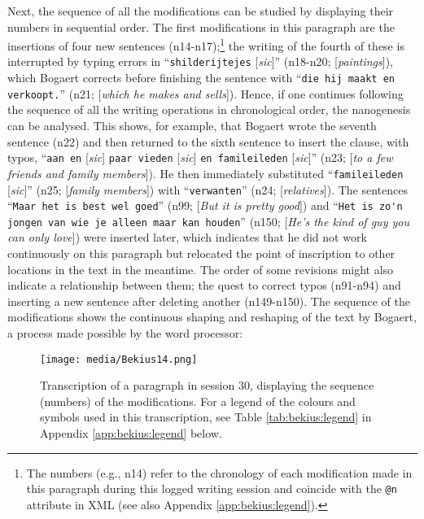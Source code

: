 \begin{paper}
\noindent Next, the sequence of all the modifications can be studied by displaying
their numbers in sequential order. The first modifications in this
paragraph are the insertions of four new sentences (n14-n17);\footnote{The numbers (e.g., n14) refer to the chronology of each modification made in this paragraph during this logged writing session and coincide with the \lstinline[language=XML]!@n! attribute in XML (see also Appendix \ref{app:bekius:legend}).} the writing of the fourth of these is interrupted by
typing errors in ``\verb|shilderijtejes| [\emph{sic}]'' (n18-n20;
[\emph{paintings}]), which Bogaert corrects before
finishing the sentence with ``\verb|die hij maakt en verkoopt.|'' (n21; [\emph{which
he makes and sells}]). Hence, if one continues following the sequence of
all the writing operations in chronological order, the nanogenesis can
be analysed. This shows, for example, that Bogaert wrote the seventh
sentence (n22) and then returned to the sixth sentence to insert the
clause, with typos, ``\verb|aan en| [\emph{sic}] \verb|paar vieden| [\emph{sic}] \verb|en famileileden|
[\emph{sic}]'' (n23; [\emph{to a few friends and family
members}]). He then immediately substituted ``\verb|famileileden|
[\emph{sic}]'' (n25; [\emph{family members}]) with ``\verb|verwanten|'' (n24; [\emph{relatives}]). The sentences ``\verb|Maar het is best wel goed|'' (n99; [\emph{But it is pretty good}]) and ``\verb|Het is zo'n jongen van wie je alleen maar kan houden|'' (n150; [\emph{He's the kind of guy you can only love}]) were
inserted later, which indicates that he did not work continuously on
this paragraph but relocated the point of inscription to other locations
in the text in the meantime. The order of some revisions might also
indicate a relationship between them; the quest to correct typos
(n91-n94) and inserting a new sentence after deleting another
(n149-n150). The sequence of the modifications shows the continuous
shaping and reshaping of the text by Bogaert, a process made possible by the word processor:

\begin{figure}[H]
    \centering
    \texttt{[image: media/Bekius14.png]}
    \caption{Transcription of a paragraph in session 30, displaying the
sequence (numbers) of the modifications. For a legend of the colours and symbols used in this transcription, see Table \ref{tab:bekius:legend} in Appendix \ref{app:bekius:legend} below.}
    \label{fig:bekius:latennumbers}
\end{figure}



\end{paper}
